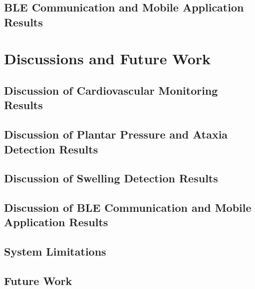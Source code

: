 \subsection{BLE Communication and Mobile Application Results}
\label{subsec:ble_mobile_results}



\section{Discussions and Future Work}
\subsection{Discussion of Cardiovascular Monitoring Results}
\label{subsec:discussion_cardiovascular}



\subsection{Discussion of Plantar Pressure and Ataxia Detection Results}
\label{subsec:discussion_plantar_pressure_ataxia}

\subsection{Discussion of Swelling Detection Results}
\label{subsec:discussion_swelling}

\subsection{Discussion of BLE Communication and Mobile Application Results}
\label{subsec:discussion_ble_mobile}

\subsection{System Limitations}
\label{subsec:system_limitations}


\subsection{Future Work}
\label{subsec:future_work}

